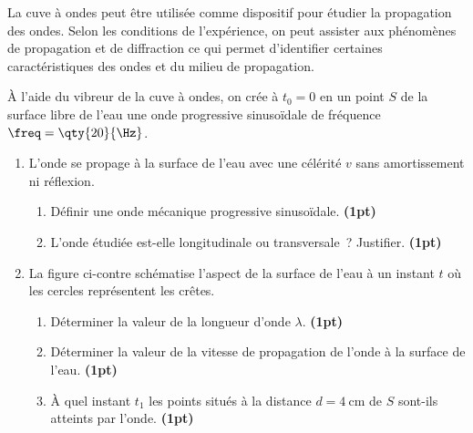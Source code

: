 La cuve à ondes peut être utilisée comme dispositif pour étudier la propagation
des ondes. Selon les conditions de l'expérience, on peut assister aux phénomènes
de propagation et de diffraction ce qui permet d'identifier certaines
caractéristiques des ondes et du milieu de propagation.

À l'aide du vibreur de la cuve à ondes, on crée à $t_{0}=0$ en un point $S$ de
la surface libre de l'eau une onde progressive sinusoïdale de fréquence
$\freq=\qty{20}{\Hz}$.

\begin{enumerate}
    \item L'onde se propage à la surface de l'eau avec une célérité $v$ sans
          amortissement ni réflexion.
          \begin{enumerate}
              \item Définir une onde mécanique progressive sinusoïdale.
                    \textbf{(1pt)}
              \item L'onde étudiée est-elle longitudinale ou transversale~?
                    Justifier.
                    \textbf{(1pt)}
          \end{enumerate}
    \item \mbox{}
          \begin{minipage}[t][][t]{0.72\linewidth}
              La figure ci-contre schématise l'aspect de la surface de l'eau à
              un instant $t$ où les cercles représentent les crêtes.
              \begin{enumerate}
                  \item Déterminer la valeur de la longueur d'onde $\lambda$.
                        \textbf{(1pt)}
                  \item Déterminer la valeur de la vitesse de propagation de
                        l'onde à la surface de l'eau.
                        \textbf{(1pt)}
                  \item À quel instant $t_{1}$ les points situés à la distance
                        $d=\qty{4}{\cm}$ de $S$ sont-ils atteints par l'onde.
                        \textbf{(1pt)}
              \end{enumerate}
          \end{minipage}
          \hfill
          \begin{minipage}[t][][t]{0.26\linewidth}
              \begin{figure}[H]
                  \centering
                  \begin{tikzpicture}[]

\end{tikzpicture}
\end{figure}
\end{minipage}
\end{enumerate}
